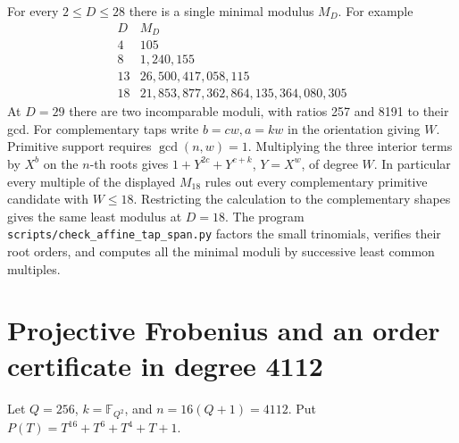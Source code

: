 \documentclass[11pt]{article}
\begin{document}
For every \(2\le D\le28\) there is a single minimal modulus \(M_D\).
For example
\[
\begin{array}{r|r}
 D & M_D\\\hline
 4 & 105\\
 8 & 1{,}240{,}155\\
 13 & 26{,}500{,}417{,}058{,}115\\
 18 & 21{,}853{,}877{,}362{,}864{,}135{,}364{,}080{,}305
\end{array}
\]
At \(D=29\) there are two incomparable moduli, with ratios 257
and 8191 to their gcd. For complementary taps write \(b=cw,a=kw\)
in the orientation giving \(W\). Primitive support requires
\(\gcd(n,w)=1\). Multiplying the three interior terms by \(X^b\)
on the \(n\)-th roots gives \(1+Y^{2c}+Y^{c+k}\), \(Y=X^w\),
of degree \(W\). In particular every multiple of the displayed
\(M_{18}\) rules out every complementary primitive candidate with
\(W\le18\). Restricting the calculation to the complementary shapes
gives the same least modulus at \(D=18\).
The program \nolinkurl{scripts/check_affine_tap_span.py} factors the
small trinomials, verifies their root orders, and computes all the
minimal moduli by successive least common multiples.

\section{Projective Frobenius and an order certificate in degree 4112}
\label{sec:projective-4112}

Let \(Q=256\), \(k=\mathbb F_{Q^2}\), and \(n=16(Q+1)=4112\).
Put \(P(T)=T^{16}+T^6+T^4+T+1\).
\end{document}
